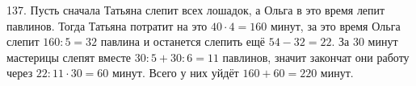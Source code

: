137. Пусть сначала Татьяна слепит всех лошадок, а Ольга в это время лепит павлинов. Тогда Татьяна потратит на это $40\cdot4=160$ минут, за это время Ольга слепит $160:5=32$ павлина и останется слепить ещё $54-32=22.$ За 30 минут мастерицы слепят вместе $30:5+30:6=11$ павлинов, значит закончат они работу через $22:11\cdot30=60$ минут. Всего у них уйдёт $160+60=220$ минут.\\
